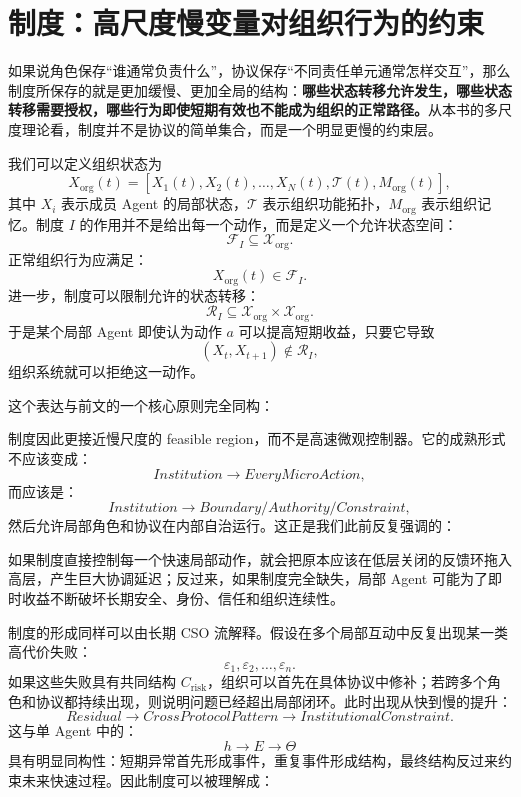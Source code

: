 \section{制度：高尺度慢变量对组织行为的约束}
\label{sec:institution}

如果说角色保存“谁通常负责什么”，协议保存“不同责任单元通常怎样交互”，那么制度所保存的就是更加缓慢、更加全局的结构：\textbf{哪些状态转移允许发生，哪些状态转移需要授权，哪些行为即使短期有效也不能成为组织的正常路径。}从本书的多尺度理论看，制度并不是协议的简单集合，而是一个明显更慢的约束层。

我们可以定义组织状态为
\[
X_{\mathrm{org}}(t)
=
\left[
X_1(t),
X_2(t),
\ldots,
X_N(t),
\mathcal T(t),
M_{\mathrm{org}}(t)
\right],
\]
其中 $X_i$ 表示成员 Agent 的局部状态，$\mathcal T$ 表示组织功能拓扑，$M_{\mathrm{org}}$ 表示组织记忆。制度 $I$ 的作用并不是给出每一个动作，而是定义一个允许状态空间：
\[
\mathcal F_I
\subseteq
\mathcal X_{\mathrm{org}}.
\]
正常组织行为应满足：
\[
X_{\mathrm{org}}(t)\in\mathcal F_I.
\]
进一步，制度可以限制允许的状态转移：
\[
\mathcal R_I
\subseteq
\mathcal X_{\mathrm{org}}\times\mathcal X_{\mathrm{org}}.
\]
于是某个局部 Agent 即使认为动作 $a$ 可以提高短期收益，只要它导致
\[
(X_t,X_{t+1})\notin\mathcal R_I,
\]
组织系统就可以拒绝这一动作。

这个表达与前文的一个核心原则完全同构：
\begin{statementbox}
\centering
{}
\end{statementbox}
制度因此更接近慢尺度的 feasible region，而不是高速微观控制器。它的成熟形式不应该变成：
\[
Institution
\rightarrow
EveryMicroAction,
\]
而应该是：
\[
Institution
\rightarrow
Boundary/Authority/Constraint,
\]
然后允许局部角色和协议在内部自治运行。这正是我们此前反复强调的：
\begin{statementbox}
\centering
{}
\end{statementbox}
如果制度直接控制每一个快速局部动作，就会把原本应该在低层关闭的反馈环拖入高层，产生巨大协调延迟；反过来，如果制度完全缺失，局部 Agent 可能为了即时收益不断破坏长期安全、身份、信任和组织连续性。

制度的形成同样可以由长期 CSO 流解释。假设在多个局部互动中反复出现某一类高代价失败：
\[
\varepsilon_1,\varepsilon_2,\ldots,\varepsilon_n.
\]
如果这些失败具有共同结构 $C_{\mathrm{risk}}$，组织可以首先在具体协议中修补；若跨多个角色和协议都持续出现，则说明问题已经超出局部闭环。此时出现从快到慢的提升：
\[
Residual
\rightarrow
CrossProtocolPattern
\rightarrow
InstitutionalConstraint.
\]
这与单 Agent 中的：
\[
h\rightarrow E\rightarrow\Theta
\]
具有明显同构性：短期异常首先形成事件，重复事件形成结构，最终结构反过来约束未来快速过程。因此制度可以被理解成：
\begin{statementbox}
\centering
{}
\end{statementbox}

